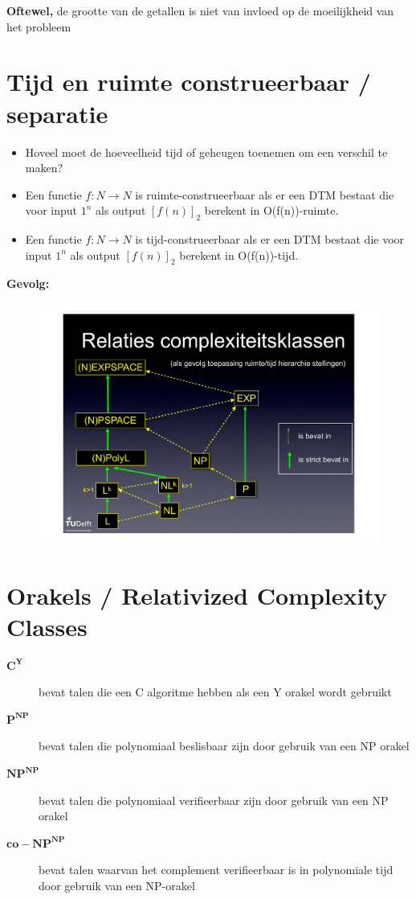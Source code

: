 \documentclass[]{article}
\begin{document}
\textbf{Oftewel,} de grootte van de getallen is niet van invloed op de moeilijkheid van het probleem

\section*{Tijd en ruimte construeerbaar / separatie}

\begin{itemize}
\item Hoveel moet de hoeveelheid tijd of geheugen toenemen om een verschil te maken?

\item Een functie $f:N \rightarrow N$ is ruimte-construeerbaar als er een DTM bestaat die voor input $1^n$ als output $[f(n)]_2$ berekent in O(f(n))-ruimte.

\item Een functie $f:N \rightarrow N$ is tijd-construeerbaar als er een DTM bestaat die voor input $1^n$ als output $[f(n)]_2$ berekent in O(f(n))-tijd.

\end{itemize}

\textbf{Gevolg:}

\begin{figure}[H]
\centering
\includegraphics[width=0.6\columnwidth]{slides/relaties}
\end{figure}

\section*{Orakels / Relativized Complexity Classes}

\begin{description}
\item[$\mathbf{C^Y}$] bevat talen die een C algoritme hebben als een Y orakel wordt gebruikt
\item[$\mathbf{P^{NP}}$] bevat talen die polynomiaal beslisbaar zijn door gebruik van een NP orakel 
\item[$\mathbf{NP^{NP}}$] bevat talen die polynomiaal verifieerbaar zijn door gebruik van een NP orakel 
\item[$\mathbf{co-NP^{NP}}$] bevat talen waarvan het complement verifieerbaar is in polynomiale tijd door gebruik van een NP-orakel
\end{description}
\end{document}
